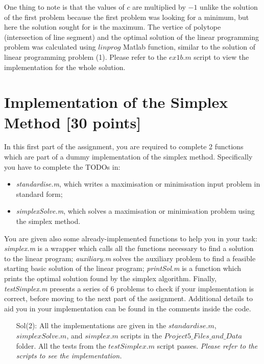 \documentclass[unicode,11pt,a4paper,oneside,numbers=endperiod,openany]{scrartcl}
\begin{document}
\vspace{20px}

One thing to note is that the values of ${c}$ are multiplied by ${-1}$ unlike the solution of the first problem because the first problem was looking for a minimum, but here the solution sought for is the maximum. The vertice of polytope (intersection of line segment) and the optimal solution of the linear programming problem was calculated using ${linprog}$ Matlab function, similar to the solution of linear programming problem (1). Please refer to the ${ex1b.m}$ script to view the implementation for the whole solution. 


\section{Implementation of the Simplex Method [30 points]}

In this first part of the assignment, you are required to complete 2 functions which are part of a dummy implementation of the simplex method. Specifically you have to complete the TODOs in:
\begin{itemize}
	\item \emph{standardise.m}, which writes a maximisation or minimisation input problem in standard form;
	\item \emph{simplexSolve.m}, which solves a maximisation or minimisation problem using the simplex method.
\end{itemize}
You are given also some already-implemented functions to help you in your task: \emph{simplex.m} is a wrapper which calls all the functions necessary to find a solution to the linear program; \emph{auxiliary.m} solves the auxiliary problem to find a feasible starting basic solution of the linear program; \emph{printSol.m} is a function which prints the optimal solution found by the simplex algorithm. Finally, \emph{testSimplex.m} presents a series of 6 problems to check if your implementation is correct, before moving to the next part of the assignment. Additional details to aid you in your implementation can be found in the comments inside the code. \\

\begin{enumerate}
 \item[Sol(2):] All the implementations are given in the ${standardise.m}$, ${simplexSolve.m}$, and ${simplex.m}$ scripts in the ${Project5\_Files\_and\_Data}$ folder. All the tests from the ${testSimplex.m}$ script passes. \textit{Please refer to the scripts to see the implementation.}
\end{enumerate}
\end{document}
